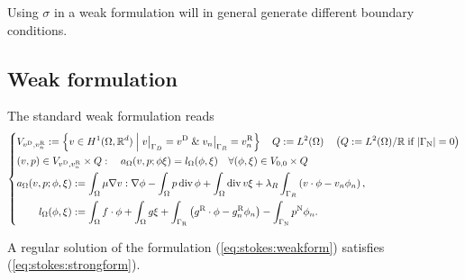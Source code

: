 Using $\sigma$ in a weak formulation will in general generate different boundary conditions.
%
\subsection{Weak formulation}\label{subsec:}
%
The standard weak formulation reads
%
\begin{equation}\label{eq:stokes:weakform}
%
\left\{
\begin{aligned}
&V_{\vD,\vn} :=  \SetDef{v\in H^1(\Omega,\R^d)}{\Rest{v}{\Gamma_D}=\vD\;\&\; \Rest{v_n}{\Gamma_R}=\vn}\quad Q := L^2(\Omega)
\quad \left( Q := L^2(\Omega)/\R \;\mbox{if $\abs{\GammaN}=0$}\right)\\
&(v,p)\in V_{\vD,\vn}\times Q:\quad a_{\Omega}(v,p; \phi\xi)  = l_{\Omega}(\phi,\xi) \quad\forall (\phi,\xi)\in V_{0,0}\times Q\\
&\begin{aligned}
a_{\Omega}(v,p; \phi,\xi) &:= \int_{\Omega} \mu \nabla v:\nabla\phi - \int_{\Omega}p \div \phi + \int_{\Omega} \div v \xi
+ \lambda_R\int_{\Gamma_R}\left(v\cdot\phi - v_n\phi_n\right),\\
 l_{\Omega}(\phi,\xi) &:= \int_{\Omega} f\cdot\phi + \int_{\Omega} g\xi + \int_{\GammaR}\left(\gR\cdot\phi - \gR_n\phi_n\right)
 -\int_{\GammaN}\pN \phi_n.
\end{aligned}
\end{aligned}
\right.
%
\end{equation}
%
\begin{lemma}\label{lemma:}
A regular solution of the formulation (\ref{eq:stokes:weakform}) satisfies (\ref{eq:stokes:strongform}).
\end{lemma}
%
